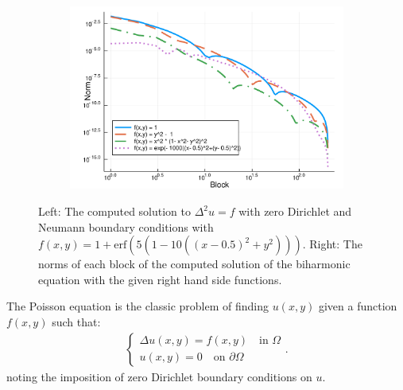 \documentclass[11pt, oneside]{article}   	%
\begin{document}
\begin{figure}[t]
	\begin{subfigure}{0.5\textwidth}
	\includegraphics[scale=0.5]{solutionblocknorms-biharmonic}
	\centering
	\end{subfigure}
	\caption{Left: The computed solution to $\Delta^2 u = f$ with zero Dirichlet and Neumann boundary conditions with $f(x,y) = 1 + \text{erf}(5(1 - 10((x - 0.5)^2 + y^2)))$. Right: The norms of each block of the computed solution of the biharmonic equation with the given right hand side functions.}
	\centering
	\label{fig:biharmonic}
\end{figure}

The Poisson equation is the classic problem of finding \(u(x,y)\) given a function \(f(x,y)\) such that:
\begin{align}
	\begin{cases}
    		\Delta u(x,y) = f(x,y) \quad \text{in } \Omega \\
		u(x,y) = 0 \quad \text{on } \partial \Omega
	\end{cases}.
	\label{eqn:poisson}
\end{align}
noting the imposition of zero Dirichlet boundary conditions on $u$.
\end{document}
